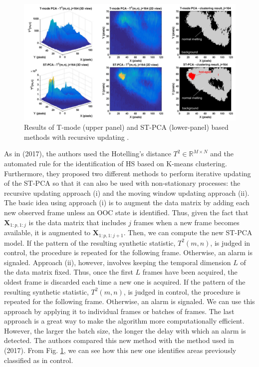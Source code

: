 \begin{figure}
    \centering
    \includegraphics[width = 0.8 \textwidth]{Images/ST-PCA vs T-PCA.png}
    \caption[ST-PCA compared to T-PCA]{Results of T-mode (upper panel) and ST-PCA (lower-panel) based methods with recursive updating \cite{colosimo_spatially_2018}.}
    \label{fig:tpcavsstpca}
\end{figure}
As in \citeauthor{grasso_-process_2017} (2017), the authors used the Hotelling's distance $T^2\in\mathbb{R}^{M\times N}$ and the automated rule for the identification of HS based on K-means clustering. Furthermore, they proposed two different methods to perform iterative updating of the ST-PCA so that it can also be used with non-stationary processes: the recursive updating approach (i) and the moving window updating approach (ii). The basic idea using approach (i) is to augment the data matrix by adding each new observed frame unless an OOC state is identified. Thus, given the fact that $\boldsymbol{X}_{1: p, 1: j}$ is the data matrix that includes $j$ frames when a new frame becomes available, it is augmented to $\mathbf{X}_{1: p, 1: j+1}$. Then, we can compute the new ST-PCA model. If the pattern of the resulting synthetic statistic, $T^2(m, n)$, is judged in control, the procedure is repeated for the following frame. Otherwise, an alarm is signaled. Approach (ii), however, involves keeping the temporal dimension $L$ of the data matrix fixed. Thus, once the first $L$ frames have been acquired, the oldest frame is discarded each time a new one is acquired. If the pattern of the resulting synthetic statistic, $T^2(m, n)$, is judged in control, the procedure is repeated for the following frame. Otherwise, an alarm is signaled. We can use this approach by applying it to individual frames or batches of frames. The last approach is a great way to make the algorithm more computationally efficient. However, the larger the batch size, the longer the delay with which an alarm is detected. The authors compared this new method with the method used in \citeauthor{grasso_-process_2017} (2017). From Fig. \ref{fig:tpcavsstpca}, we can see how this new one identifies areas previously classified as in control.
